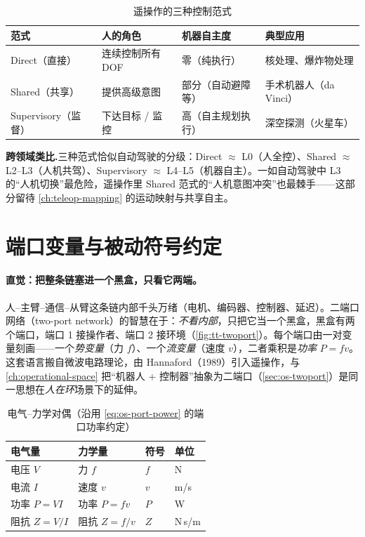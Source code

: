 \begin{table}[H]\centering\small
\caption{遥操作的三种控制范式}
\label{tab:tt-paradigm}
\begin{tabular}{llll}
\toprule
范式 & 人的角色 & 机器自主度 & 典型应用 \\
\midrule
Direct（直接） & 连续控制所有 DOF & 零（纯执行） & 核处理、爆炸物处理 \\
Shared（共享） & 提供高级意图 & 部分（自动避障等） & 手术机器人（da Vinci） \\
Supervisory（监督） & 下达目标 / 监控 & 高（自主规划执行） & 深空探测（火星车） \\
\bottomrule
\end{tabular}
\end{table}

\begin{note}
\textbf{跨领域类比.}\;三种范式恰似自动驾驶的分级：Direct $\approx$ L0（人全控）、Shared $\approx$ L2--L3（人机共驾）、Supervisory $\approx$ L4--L5（机器自主）。一如自动驾驶中 L3 的“人机切换”最危险，遥操作里 Shared 范式的“人机意图冲突”也最棘手——这部分留待 \cref{ch:teleop-mapping} 的运动映射与共享自主。
\end{note}

\section{端口变量与被动符号约定}
\label{sec:tt-port}

\paragraph{直觉：把整条链塞进一个黑盒，只看它两端。}
人--主臂--通信--从臂这条链内部千头万绪（电机、编码器、控制器、延迟）。二端口网络（two-port network）的智慧在于：\emph{不看内部}，只把它当一个黑盒，黑盒有两个端口，端口 1 接操作者、端口 2 接环境（\cref{fig:tt-twoport}）。每个端口由一对变量刻画——一个\emph{势变量}（力 $f$）、一个\emph{流变量}（速度 $v$），二者乘积是\emph{功率} $P=fv$。这套语言搬自微波电路理论，由 Hannaford（1989）引入遥操作\cite{hannaford1989design}，与 \cref{ch:operational-space} 把“机器人 + 控制器”抽象为二端口（\cref{sec:os-twoport}）是同一思想在\emph{人在环}场景下的延伸。

\begin{table}[H]\centering\small
\caption{电气--力学对偶（沿用 \cref{eq:os-port-power} 的端口功率约定）}
\label{tab:tt-analogy}
\begin{tabular}{llll}
\toprule
电气量 & 力学量 & 符号 & 单位 \\
\midrule
电压 $V$ & 力 $f$ & $f$ & N \\
电流 $I$ & 速度 $v$ & $v$ & m/s \\
功率 $P=VI$ & 功率 $P=fv$ & $P$ & W \\
阻抗 $Z=V/I$ & 阻抗 $Z=f/v$ & $Z$ & N\,s/m \\
\bottomrule
\end{tabular}
\end{table}

